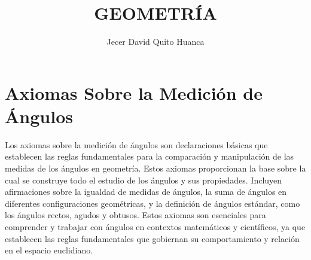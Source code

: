 \documentclass[12pt a4paper]{article}
\title{GEOMETRÍA}
\author{Jecer David Quito Huanca}
\begin{document}
\maketitle
\section{Axiomas Sobre la Medición de Ángulos}
Los axiomas sobre la medición de ángulos son declaraciones básicas que establecen las reglas fundamentales para la comparación y manipulación de las medidas de los ángulos en geometría. Estos axiomas proporcionan la base sobre la cual se construye todo el estudio de los ángulos y sus propiedades. Incluyen afirmaciones sobre la igualdad de medidas de ángulos, la suma de ángulos en diferentes configuraciones geométricas, y la definición de ángulos estándar, como los ángulos rectos, agudos y obtusos. Estos axiomas son esenciales para comprender y trabajar con ángulos en contextos matemáticos y científicos, ya que establecen las reglas fundamentales que gobiernan su comportamiento y relación en el espacio euclidiano.
\end{document}
